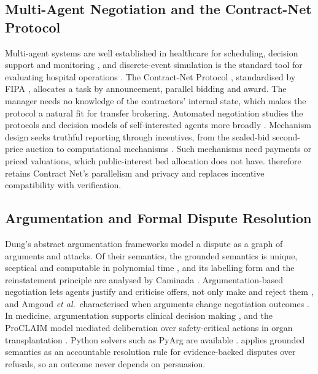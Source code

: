 \subsection{Multi-Agent Negotiation and the Contract-Net Protocol}
Multi-agent systems are well established in healthcare for scheduling, decision support and monitoring \cite{isern2010agents,isern2016review}, and discrete-event simulation is the standard tool for evaluating hospital operations \cite{gunal2010des}. The Contract-Net Protocol \cite{smith1980contract}, standardised by FIPA \cite{fipa2002cnp}, allocates a task by announcement, parallel bidding and award. The manager needs no knowledge of the contractors' internal state, which makes the protocol a natural fit for transfer brokering. Automated negotiation studies the protocols and decision models of self-interested agents more broadly \cite{jennings2001negotiation}. Mechanism design seeks truthful reporting through incentives, from the sealed-bid second-price auction \cite{vickrey1961counterspeculation} to computational mechanisms \cite{nisan2001amd}. Such mechanisms need payments or priced valuations, which public-interest bed allocation does not have. \mahros{} therefore retains Contract Net's parallelism and privacy and replaces incentive compatibility with verification.

\subsection{Argumentation and Formal Dispute Resolution}
Dung's abstract argumentation frameworks \cite{dung1995acceptability} model a dispute as a graph of arguments and attacks. Of their semantics, the grounded semantics is unique, sceptical and computable in polynomial time \cite{baroni2011semantics,modgil2009algorithms}, and its labelling form and the reinstatement principle are analysed by Caminada \cite{caminada2006reinstatement}. Argumentation-based negotiation lets agents justify and criticise offers, not only make and reject them \cite{rahwan2003abn}, and Amgoud \emph{et al.}\ characterised when arguments change negotiation outcomes \cite{amgoud2007unified}. In medicine, argumentation supports clinical decision making \cite{fox2007argumentation}, and the ProCLAIM model mediated deliberation over safety-critical actions in organ transplantation \cite{tolchinsky2012deliberation}. Python solvers such as PyArg are available \cite{odekerken2022pyarg}. \mahros{} applies grounded semantics as an accountable resolution rule for evidence-backed disputes over refusals, so an outcome never depends on persuasion.

